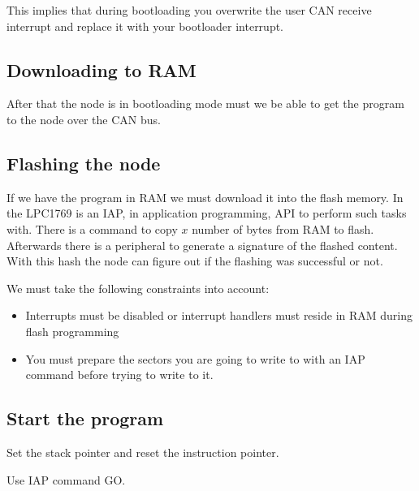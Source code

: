 \documentclass[twocolumn]{article}
\begin{document}
			This implies that during bootloading you overwrite the user CAN receive interrupt and replace it with your bootloader interrupt.
	
	\subsection*{Downloading to RAM}
		After that the node is in bootloading mode must we be able to get the program to the node over the CAN bus.
		
	
	\subsection*{Flashing the node}
		If we have the program in RAM we must download it into the flash memory.
		In the LPC1769 is an IAP, in application programming, API to perform such tasks with.
		There is a command to copy $x$ number of bytes from RAM to flash.
		Afterwards there is a peripheral to generate a signature of the flashed content.
		With this hash the node can figure out if the flashing was successful or not.
		
		We must take the following constraints into account:
		\begin{itemize}
			\item Interrupts must be disabled or interrupt handlers must reside in RAM during flash programming
			\item You must prepare the sectors you are going to write to with an IAP command before trying to write to it.
		\end{itemize}
	
	\subsection*{Start the program}
		Set the stack pointer and reset the instruction pointer.
		
		Use IAP command GO.
	
	
	
	
	
	
	
\end{document}
